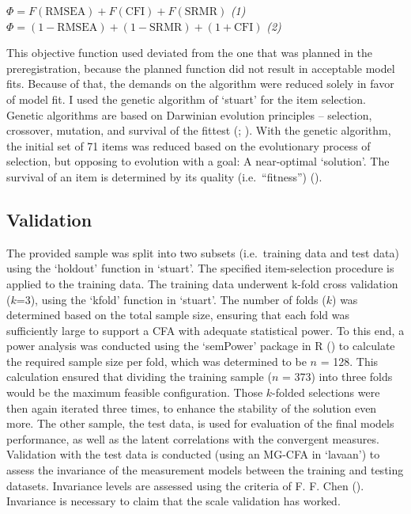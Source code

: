 \documentclass[
  12pt,
  a4paper,
  twoside]{article}
\begin{document}
\begin{center}
$\Phi = F(\textrm{RMSEA}) + F(\textrm{CFI}) + F(\textrm{SRMR})$ \textit{(1)}\\
$\Phi = (1 - \textrm{RMSEA}) + (1 - \textrm{SRMR}) + (1 + \textrm{CFI})$ \textit{(2)}
\end{center}

This objective function used deviated from the one that was planned in the preregistration, because the planned function did not result in acceptable model fits. Because of that, the demands on the algorithm were reduced solely in favor of model fit.
I used the genetic algorithm of `stuart' for the item selection. Genetic algorithms are based on Darwinian evolution principles -- selection, crossover, mutation, and survival of the fittest (; ). With the genetic algorithm, the initial set of 71 items was reduced based on the evolutionary process of selection, but opposing to evolution with a goal: A near-optimal `solution'. The survival of an item is determined by its quality (i.e.~``fitness'') ().

\subsection{Validation}\label{validation}

The provided sample was split into two subsets (i.e.~training data and test data) using the `holdout' function in `stuart'. The specified item-selection procedure is applied to the training data. The training data underwent k-fold cross validation (\(k\)=3), using the `kfold' function in `stuart'.
The number of folds (\(k\)) was determined based on the total sample size, ensuring that each fold was sufficiently large to support a CFA with adequate statistical power. To this end, a power analysis was conducted using the `semPower' package in R () to calculate the required sample size per fold, which was determined to be \(n\) = 128. This calculation ensured that dividing the training sample (\(n\) = 373) into three folds would be the maximum feasible configuration.
Those \(k\)-folded selections were then again iterated three times, to enhance the stability of the solution even more. The other sample, the test data, is used for evaluation of the final models performance, as well as the latent correlations with the convergent measures.
Validation with the test data is conducted (using an MG-CFA in `lavaan') to assess the invariance of the measurement models between the training and testing datasets. Invariance levels are assessed using the criteria of F. F. Chen (). Invariance is necessary to claim that the scale validation has worked.
\end{document}
